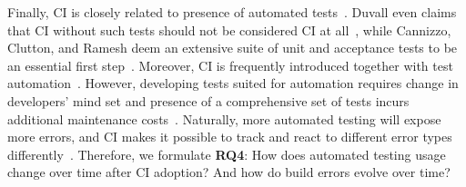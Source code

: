 Finally, CI is closely related to presence of automated tests~\cite{Fowler}. 
Duvall even claims that CI without such tests should not be considered CI 
at all~\cite{Duvall}, while Cannizzo, Clutton, and Ramesh deem an extensive 
suite of unit and acceptance tests to be an essential first step~\cite{CannizzoCluttonRamesh}. 
Moreover, CI is frequently introduced together with test automation~\cite{Yuksel}.
However, developing tests suited for automation requires change in developers' 
mind set and presence of a comprehensive set of tests incurs additional maintenance 
costs~\cite{CoramBohner}.
Naturally, more automated testing will expose more errors, and CI makes it possible 
to track and react to different error types differently~\cite{BellerGZ16}.
Therefore, we formulate \textbf{RQ4}: 
How does automated testing usage change over time after CI adoption? 
And how do build errors evolve over time? 

